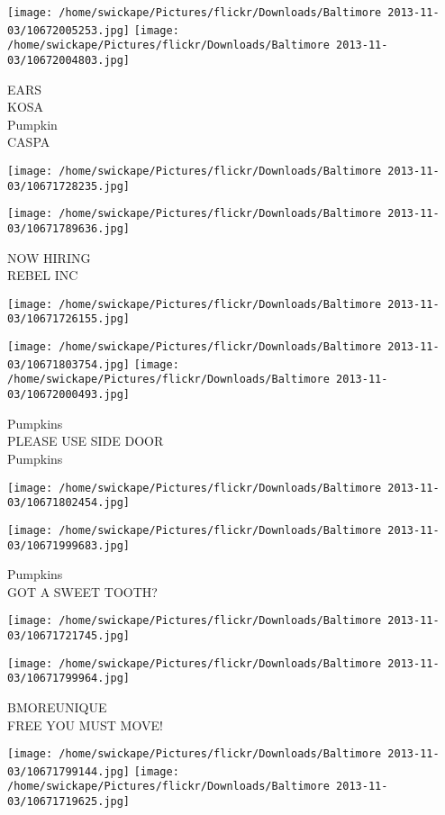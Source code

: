 \documentclass[10pt,letterpaper]{article}
\begin{document}
\texttt{[image: /home/swickape/Pictures/flickr/Downloads/Baltimore 2013-11-03/10672005253.jpg]}
\texttt{[image: /home/swickape/Pictures/flickr/Downloads/Baltimore 2013-11-03/10672004803.jpg]}

EARS\\
KOSA\\
Pumpkin\\
CASPA
\pagebreak

\texttt{[image: /home/swickape/Pictures/flickr/Downloads/Baltimore 2013-11-03/10671728235.jpg]}

\vspace{0.25in}
\texttt{[image: /home/swickape/Pictures/flickr/Downloads/Baltimore 2013-11-03/10671789636.jpg]}

NOW HIRING\\
REBEL INC
\pagebreak

\texttt{[image: /home/swickape/Pictures/flickr/Downloads/Baltimore 2013-11-03/10671726155.jpg]}

\vspace{0.25in}
\texttt{[image: /home/swickape/Pictures/flickr/Downloads/Baltimore 2013-11-03/10671803754.jpg]}
\texttt{[image: /home/swickape/Pictures/flickr/Downloads/Baltimore 2013-11-03/10672000493.jpg]}

Pumpkins\\
PLEASE USE SIDE DOOR\\
Pumpkins
\pagebreak

\texttt{[image: /home/swickape/Pictures/flickr/Downloads/Baltimore 2013-11-03/10671802454.jpg]}

\vspace{0.25in}
\texttt{[image: /home/swickape/Pictures/flickr/Downloads/Baltimore 2013-11-03/10671999683.jpg]}

Pumpkins\\
GOT A SWEET TOOTH?
\pagebreak

\texttt{[image: /home/swickape/Pictures/flickr/Downloads/Baltimore 2013-11-03/10671721745.jpg]}

\vspace{0.25in}
\texttt{[image: /home/swickape/Pictures/flickr/Downloads/Baltimore 2013-11-03/10671799964.jpg]}

BMOREUNIQUE\\
FREE YOU MUST MOVE!
\pagebreak

\texttt{[image: /home/swickape/Pictures/flickr/Downloads/Baltimore 2013-11-03/10671799144.jpg]}
\texttt{[image: /home/swickape/Pictures/flickr/Downloads/Baltimore 2013-11-03/10671719625.jpg]}
\end{document}
